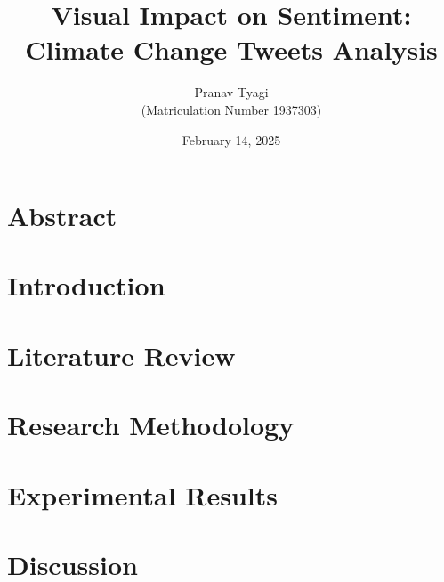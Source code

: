 \documentclass[a4paper,oneside,bibliography=totoc]{scrbook}
\begin{document}
\frontmatter \subject{Master Thesis} %
\title{Visual Impact on Sentiment: Climate Change Tweets Analysis}
\author{Pranav Tyagi\\
  (Matriculation Number 1937303)} \date{February 14, 2025}
\publishers{{\small Submitted to}\\
  Data and Web Science Group\\
  Prof.\ Dr.\ Margret Keuper\\
  University of Mannheim\\}
\maketitle


\chapter{Abstract}
\label{ch:abstract}



\begingroup%
\hypersetup{hidelinks}%
\tableofcontents%
\endgroup

\begingroup%
\hypersetup{hidelinks}%
\listoffigures%
\endgroup

\begingroup%
\hypersetup{hidelinks}%
\listoftables%
\endgroup

\mainmatter

\chapter{Introduction}
\label{ch:intro}



\chapter{Literature Review}
\label{ch:background}



\chapter{Research Methodology}
\label{ch:method}



\chapter{Experimental Results}
\label{ch:results}



\chapter{Discussion}
\label{ch:discussion}

\end{document}
